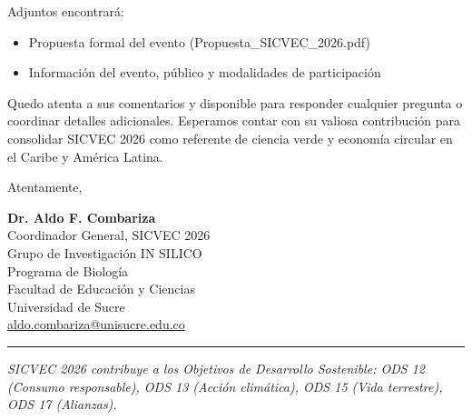 \documentclass[12pt,a4paper]{article}
\begin{document}
\vspace{0.3cm}

Adjuntos encontrará:
\begin{itemize}
  \item Propuesta formal del evento (Propuesta\_SICVEC\_2026.pdf)
  \item Información del evento, público y modalidades de participación
\end{itemize}

\vspace{0.3cm}

Quedo atenta a sus comentarios y disponible para responder cualquier pregunta o coordinar detalles adicionales. Esperamos contar con su valiosa contribución para consolidar SICVEC 2026 como referente de ciencia verde y economía circular en el Caribe y América Latina.

\vspace{0.4cm}

Atentamente,

\vspace{0.4cm}

\textbf{Dr. Aldo F. Combariza}\\
Coordinador General, SICVEC 2026\\
Grupo de Investigación IN SILICO\\
Programa de Biología\\
Facultad de Educación y Ciencias\\
Universidad de Sucre\\
\href{mailto:aldo.combariza@unisucre.edu.co}{aldo.combariza@unisucre.edu.co}

\vspace{0.4cm}

\noindent
\rule{\textwidth}{0.5pt}

\vspace{0.5cm}

\noindent
\textit{\small SICVEC 2026 contribuye a los Objetivos de Desarrollo Sostenible: ODS 12 (Consumo responsable), ODS 13 (Acción climática), ODS 15 (Vida terrestre), ODS 17 (Alianzas).}
\end{document}
